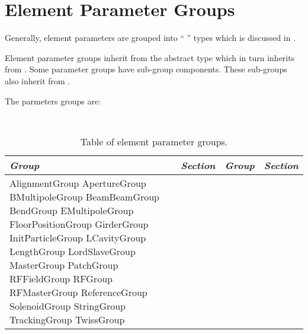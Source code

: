 \chapter{Element Parameter Groups}
\label{c:ele.groups}

Generally, element parameters are grouped into ``  '' 
types which is discussed in .

Element parameter groups inherit from the abstract type  which
in turn inherits from . Some
parameter groups have sub-group components. These sub-groups also inherit from .

The parmeters groups are:
\begin{table}[htb]
\centering
{\tt
\begin{tabular}{llll} \toprule
  {\it Group}    & {\it Section}         & {\it Group}      & {\it Section}       \\ \midrule
 AlignmentGroup
 ApertureGroup
 BMultipoleGroup
 BeamBeamGroup
 BendGroup
 EMultipoleGroup
 FloorPositionGroup
 GirderGroup
 InitParticleGroup
 LCavityGroup
 LengthGroup
 LordSlaveGroup
 MasterGroup
 PatchGroup
 RFFieldGroup
 RFGroup
 RFMasterGroup
 ReferenceGroup
 SolenoidGroup
 StringGroup
 TrackingGroup
 TwissGroup

  \bottomrule
\end{tabular}
} 
\caption{Table of element parameter groups.}
\label{t:particle.classes}
\end{table}